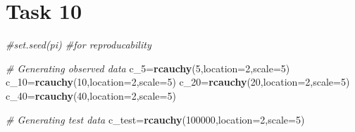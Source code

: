\documentclass[]{article}
\newenvironment{Shaded}{\begin{snugshade}}{\end{snugshade}}
\newcommand{\KeywordTok}[1]{\textcolor[rgb]{0.13,0.29,0.53}{\textbf{#1}}}
\newcommand{\DataTypeTok}[1]{\textcolor[rgb]{0.13,0.29,0.53}{#1}}
\newcommand{\DecValTok}[1]{\textcolor[rgb]{0.00,0.00,0.81}{#1}}
\newcommand{\CommentTok}[1]{\textcolor[rgb]{0.56,0.35,0.01}{\textit{#1}}}
\newcommand{\NormalTok}[1]{#1}
\begin{document}
\section{Task 10}\label{task-10}

\begin{Shaded}
\begin{Highlighting}[]
\CommentTok{#set.seed(pi) #for reproducability}

\CommentTok{# Generating observed data}
\NormalTok{c_}\DecValTok{5}\NormalTok{=}\KeywordTok{rcauchy}\NormalTok{(}\DecValTok{5}\NormalTok{,}\DataTypeTok{location=}\DecValTok{2}\NormalTok{,}\DataTypeTok{scale=}\DecValTok{5}\NormalTok{)}
\NormalTok{c_}\DecValTok{10}\NormalTok{=}\KeywordTok{rcauchy}\NormalTok{(}\DecValTok{10}\NormalTok{,}\DataTypeTok{location=}\DecValTok{2}\NormalTok{,}\DataTypeTok{scale=}\DecValTok{5}\NormalTok{)}
\NormalTok{c_}\DecValTok{20}\NormalTok{=}\KeywordTok{rcauchy}\NormalTok{(}\DecValTok{20}\NormalTok{,}\DataTypeTok{location=}\DecValTok{2}\NormalTok{,}\DataTypeTok{scale=}\DecValTok{5}\NormalTok{)}
\NormalTok{c_}\DecValTok{40}\NormalTok{=}\KeywordTok{rcauchy}\NormalTok{(}\DecValTok{40}\NormalTok{,}\DataTypeTok{location=}\DecValTok{2}\NormalTok{,}\DataTypeTok{scale=}\DecValTok{5}\NormalTok{)}

\CommentTok{# Generating test data}
\NormalTok{c_test=}\KeywordTok{rcauchy}\NormalTok{(}\DecValTok{100000}\NormalTok{,}\DataTypeTok{location=}\DecValTok{2}\NormalTok{,}\DataTypeTok{scale=}\DecValTok{5}\NormalTok{)}
\end{Highlighting}
\end{Shaded}
\end{document}

